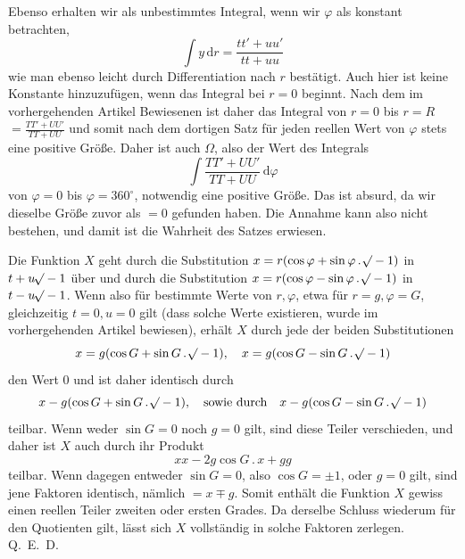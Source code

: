 Ebenso erhalten wir als unbestimmtes Integral, wenn wir $\varphi$ als konstant betrachten,
\[
\int y\,\mathrm dr=\frac{tt'+uu'}{tt+uu}
\]
wie man ebenso leicht durch Differentiation nach $r$ bestätigt. Auch hier ist keine Konstante hinzuzufügen, wenn das Integral bei $r=0$ beginnt. Nach dem im vorhergehenden Artikel Bewiesenen ist daher das Integral von $r=0$ bis $r=R$ $=\frac{TT'+UU'}{TT+UU}$ und somit nach dem dortigen Satz für jeden reellen Wert von $\varphi$ stets eine positive Größe. Daher ist auch $\Omega$, also der Wert des Integrals
\[
\int\frac{TT'+UU'}{TT+UU}\,\mathrm d\varphi
\]
von $\varphi=0$ bis $\varphi=360^\circ$, notwendig eine positive Größe. Das ist absurd, da wir dieselbe Größe zuvor als $=0$ gefunden haben. Die Annahme kann also nicht bestehen, und damit ist die Wahrheit des Satzes erwiesen.

Die Funktion $X$ geht durch die Substitution $x=r(\cos\varphi+\sin\varphi\, .\,\mathord{{}^{}\!\surd}-1)$ in $t+u\mathord{{}^{}\!\surd}-1$ über und durch die Substitution $x=r(\cos\varphi-\sin\varphi\, .\,\mathord{{}^{}\!\surd}-1)$ in $t-u\mathord{{}^{}\!\surd}-1$. Wenn also für bestimmte Werte von $r,\varphi$, etwa für $r=g,\varphi=G$, gleichzeitig $t=0,u=0$ gilt (dass solche Werte existieren, wurde im vorhergehenden Artikel bewiesen), erhält $X$ durch jede der beiden Substitutionen
\[
x=g(\cos G+\sin G\, .\,\mathord{{}^{}\!\surd}-1),\quad x=g(\cos G-\sin G\, .\,\mathord{{}^{}\!\surd}-1)
\]
den Wert 0 und ist daher identisch durch
\[
x-g(\cos G+\sin G\, .\,\mathord{{}^{}\!\surd}-1),\quad\text{sowie durch}\quad x-g(\cos G-\sin G\, .\,\mathord{{}^{}\!\surd}-1)
\]
teilbar. Wenn weder $\sin G=0$ noch $g=0$ gilt, sind diese Teiler verschieden, und daher ist $X$ auch durch ihr Produkt
\[
xx-2g\cos G\, .\,x+gg
\]
teilbar. Wenn dagegen entweder $\sin G=0$, also $\cos G=\pm1$, oder $g=0$ gilt, sind jene Faktoren identisch, nämlich $=x\mp g$. Somit enthält die Funktion $X$ gewiss einen reellen Teiler zweiten oder ersten Grades. Da derselbe Schluss wiederum für den Quotienten gilt, lässt sich $X$ vollständig in solche Faktoren zerlegen. Q.~E.~D.

